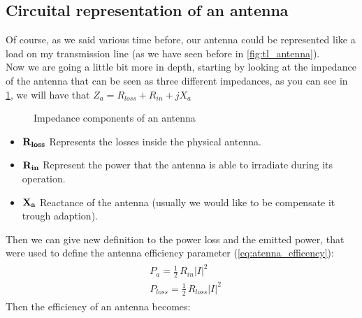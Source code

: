 \subsection*{Circuital representation of an antenna}
Of course, as we said various time before, our antenna could be represented like a load on my transmission line (as we have seen before in \cref{fig:tl_antenna}).\\
Now we are going a little bit more in depth, starting by looking at the impedance of the antenna that can be seen as three different impedances, as you can see in \cref{fig:impedance_antenna}, we will have that $Z_a=R_{loss}+R_{in}+jX_a$ 
\begin{figure}[H]
    \begin{center}
    \end{center} \caption{Impedance components of an antenna}\label{fig:impedance_antenna} 
\end{figure}
\begin{itemize}
    \item $\bf{R_{loss}}$ Represents the losses inside the physical antenna.
    \item $\bf{R_{in}}$ Represent the power that the antenna is able to irradiate during its operation.
    \item $\bf{X_{a}}$ Reactance of the antenna (usually we would like to be compensate it trough adaption).
\end{itemize}
Then we can give new definition to the power loss and the emitted power, that were used to define the antenna efficiency parameter (\cref{eq:atenna_efficency}):
\begin{align}\label{eq:emitted_power2}
    \begin{split}
        &P_a=\frac{1}{2}\,R_{in}|I|^2\\[5pt]
        &P_{loss}=\frac{1}{2}\,R_{loss}|I|^2
    \end{split}
\end{align}
Then the efficiency of an antenna becomes:
